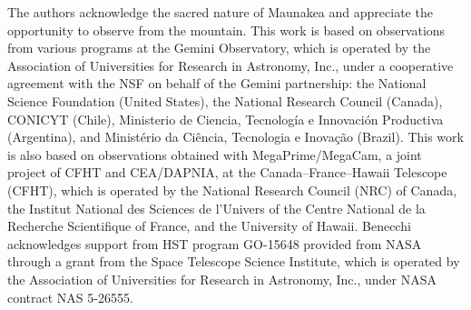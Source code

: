 \documentclass[twocolumn]{aastex63}
\newcommand{\bluebinaries}{{\it blue binaries}}
\begin{document}



\acknowledgements

The authors acknowledge the sacred nature of Maunakea and appreciate the opportunity to observe from the mountain. This work is based on observations from various programs at the Gemini Observatory, which is operated by the Association of Universities for Research in Astronomy, Inc., under a cooperative agreement with the NSF on behalf of the Gemini partnership: the National Science Foundation (United States), the National Research Council (Canada), CONICYT (Chile), Ministerio de Ciencia, Tecnolog\'{i}a e Innovaci\'{o}n Productiva (Argentina), and Minist\'{e}rio da Ci\^{e}ncia, Tecnologia e Inova\c{c}\~{a}o (Brazil). This work is also based on observations obtained with MegaPrime/MegaCam, a joint project of CFHT and CEA/DAPNIA, at the Canada–France–Hawaii Telescope (CFHT), which is operated by the National Research Council (NRC) of Canada, the Institut National des Sciences de l’Univers of the Centre National de la Recherche Scientifique of France, and the University of Hawaii.
Benecchi acknowledges support from HST program GO-15648 provided from NASA through a grant from the Space Telescope Science Institute, which is operated by the Association of Universities for Research in Astronomy, Inc., under NASA contract NAS 5-26555.



 
\end{document}

